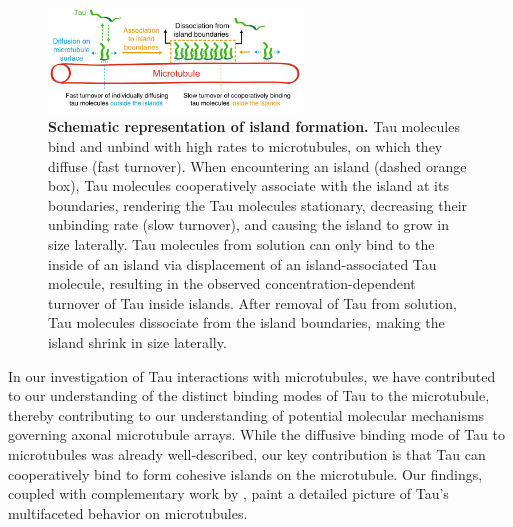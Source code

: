 \begin{figure}[h!tb]
\centering
\includegraphics[width=0.6\textwidth]{Figures/Tau8.png}
\caption[Schematic representation of island formation.]{
\textbf{Schematic representation of island formation.} Tau molecules bind and unbind with high rates to microtubules, on which they diffuse (fast turnover). When encountering an island (dashed orange box), Tau molecules cooperatively associate with the island at its boundaries, rendering the Tau molecules stationary, decreasing their unbinding rate (slow turnover), and causing the island to grow in size laterally. Tau molecules from solution can only bind to the inside of an island via displacement of an island-associated Tau molecule, resulting in the observed concentration-dependent turnover of Tau inside islands. After removal of Tau from solution, Tau molecules dissociate from the island boundaries, making the island shrink in size laterally.
	}\label{Tau8}
\end{figure}
In our investigation of Tau interactions with microtubules, we have contributed to our understanding of the distinct binding modes of Tau to the microtubule, thereby contributing to our understanding of potential molecular mechanisms governing axonal microtubule arrays. While the diffusive binding mode of Tau to microtubules was already well-described, our key contribution is that Tau can cooperatively bind to form cohesive islands on the microtubule. Our findings, coupled with complementary work by \cite{tan2019microtubules}, paint a detailed picture of Tau's multifaceted behavior on microtubules.\par

